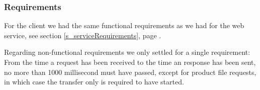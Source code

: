 \subsubsection{Requirements}
For the client we had the same functional requirements as we had for the web service, see section \ref{s_serviceRequirements}, page \pageref{s_serviceRequirements}.

Regarding non-functional requirements we only settled for a single requirement: From the time a request has been received to the time an response has been sent, no more than 1000 millisecond must have passed, except for product file requests, in which case the transfer only is required to have started.